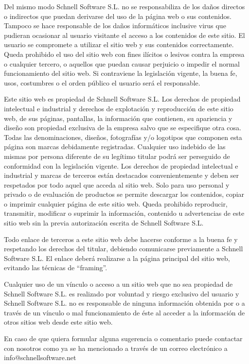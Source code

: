 \documentclass[10pt,a4paper]{article}
\begin{document}
\begin{enumerate}
Del mismo modo Schnell Software S.L. no se responsabiliza de los daños directos o indirectos que puedan derivarse del uso de la página web o sus contenidos. Tampoco se hace responsable de los daños informáticos inclusive virus que pudieran ocasionar al usuario visitante el acceso a los contenidos de este sitio.
El usuario se compromete a utilizar el sitio web y sus contenidos correctamente. Queda prohibido el uso del sitio web con fines ilícitos o lesivos contra la empresa o cualquier tercero, o aquellos que puedan causar perjuicio o impedir el normal funcionamiento del sitio web. Si contraviene la legislación vigente, la buena fe, usos, costumbres o el orden público el usuario será el responsable.

Este sitio web es propiedad de Schnell Software S.L. Los derechos de propiedad intelectual e industrial y derechos de explotación y reproducción de este sitio web, de sus páginas, pantallas, la información que contienen, su apariencia y diseño son propiedad exclusiva de la empresa salvo que se especifique otra cosa. Todas las denominaciones, diseños, fotografías y/o logotipos que componen esta página son marcas debidamente registradas. Cualquier uso indebido de las mismas por persona diferente de su legítimo titular podrá ser perseguido de conformidad con la legislación vigente. Los derechos de propiedad intelectual e industrial y marcas de terceros están destacados convenientemente y deben ser respetados por todo aquel que acceda al sitio web. Solo para uso personal y privado o de evaluación de productos se permite descargar los contenidos, copiar o imprimir cualquier página de este sitio web. Queda prohibido reproducir, transmitir, modificar o suprimir la información, contenido u advertencias de este sitio web sin la previa autorización escrita de Schnell Software S.L.

Todo enlace de terceros a este sitio web debe hacerse conforme a la buena fe y respetando los derechos del titular, debiendo comunicarse previamente a Schnell Software S.L. El enlace deberá realizarse a la página principal del sitio web, evitando las técnicas de “framing”.

Cualquier uso de un vínculo o acceso a un sitio web que no sea propiedad de Schnell Software S.L. es realizado por voluntad y riesgo exclusivo del usuario y Schnell Software S.L. no es responsable de ninguna información obtenida por o a través de un vínculo o mal funcionamiento de éste al acceder a la información de otros sitios web desde este sitio web.

En caso de que quiera formular alguna sugerencia o comentario puede contactar con nosotros como ya se ha mencionado a través de un correo electrónico a info@schnellsoftware.net


\end{enumerate}
\end{document}
